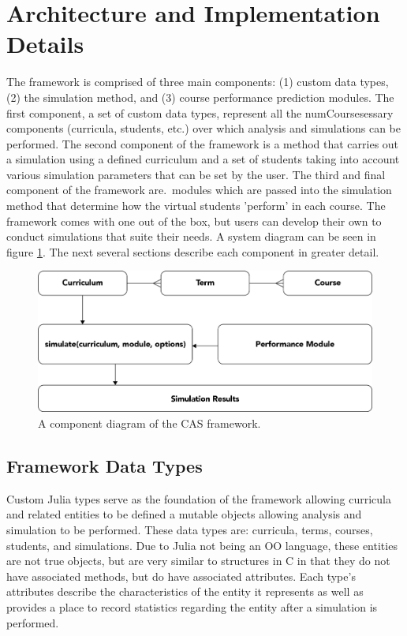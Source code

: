\documentclass[botnum, fleqn]{unmeethesis}
\begin{document}
  \section{Architecture and Implementation Details}
    The framework is comprised of three main components: (1) custom data types, (2) the simulation method, and (3) course performance prediction modules. The first component, a set of custom data types, represent all the numCoursesessary components (curricula, students, etc.) over which analysis and simulations can be performed. The second component of the framework is a method that carries out a simulation using a defined curriculum and a set of students taking into account various simulation parameters that can be set by the user. The third and final component of the framework are.\ modules which are passed into the simulation method that determine how the virtual students 'perform' in each course. The framework comes with one out of the box, but users can develop their own to conduct simulations that suite their needs. A system diagram can be seen in figure \ref{fig:component_diagram}. The next several sections describe each component in greater detail.

    \begin{figure}[h!]
      \centerline{\includegraphics[scale=0.4]{./figures/components.png}}
      \caption{A component diagram of the CAS framework.} 
      \label{fig:component_diagram}
    \end{figure}

    \subsection{Framework Data Types}
      Custom Julia types serve as the foundation of the framework allowing curricula and related entities to be defined a mutable objects allowing analysis and simulation to be performed. These data types are: curricula, terms, courses, students, and simulations. Due to Julia not being an OO language, these entities are not true objects, but are very similar to structures in C in that they do not have associated methods, but do have associated attributes. Each type's attributes describe the characteristics of the entity it represents as well as provides a place to record statistics regarding the entity after a simulation is performed.
\end{document}
